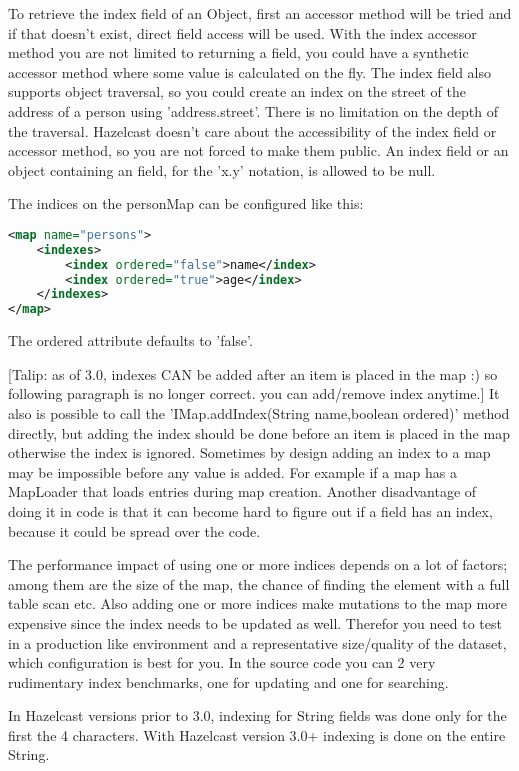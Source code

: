 To retrieve the index field of an Object, first an accessor method will be tried and if that doesn't exist, direct field access will be used. With the index accessor method you are not limited to returning a field, you could have a synthetic accessor method where some value is calculated on the fly. The index field also supports object traversal, so you could create an index on the street of the address of a person using 'address.street'. There is no limitation on the depth of the traversal. Hazelcast doesn't care about the accessibility of the index field or accessor method, so you are not forced to make them public. An index field or an object containing an field, for the 'x.y' notation, is allowed to be null.

The indices on the personMap can be configured like this:
\begin{lstlisting}[language=xml]
<map name="persons">
    <indexes>
        <index ordered="false">name</index>
        <index ordered="true">age</index>
    </indexes>
</map>
\end{lstlisting}

The ordered attribute defaults to 'false'. 

[Talip: as of 3.0, indexes CAN be added after an item is placed in the map :) so following paragraph is no longer correct. you can add/remove index anytime.]
It also is possible to call the 'IMap.addIndex(String name,boolean ordered)' method directly, but adding the index should be done before an item is placed in the map otherwise the index is ignored. Sometimes by design adding an index to a map may be impossible before any value is added. For example if a map has a MapLoader that loads entries during map creation. Another disadvantage of doing it in code is that it can become hard to figure out if a field has an index, because it could be spread over the code.

The performance impact of using one or more indices depends on a lot of factors; among them are the size of the map, the chance of finding the element with a full table scan etc. Also adding one or more indices make mutations to the map more expensive since the index needs to be updated as well. Therefor you need to test in a production like environment and a representative size/quality of the dataset, which configuration is best for you. In the source code you can 2 very rudimentary index benchmarks, one for updating and one for searching. 

In Hazelcast versions prior to 3.0, indexing for String fields was done only for the first the 4 characters. With Hazelcast version 3.0+ indexing is done on the entire String.

